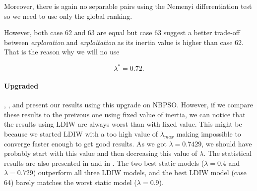\documentclass[12pt, openany]{article}
\begin{document}
Moreover, there is again no separable pairs using the Nemenyi differentiation test so we need to use only the global ranking.

\begin{table}[H]
    \centering
    \renewcommand{\arraystretch}{1.3}
    \caption{\textbf{Summary of statistical significance tests for the static inertia weight $\lambda$ (Cases 61--63).} The Critical Difference (CD) sets the threshold for Nemenyi pairwise significance. No difference is significant at $\alpha=0.05$ (the global test is borderline, $p \approx 0.07$, with the high-inertia Case~61 ranked weakest).}
    \label{tab:statistical_tests_inertia}
\end{table}

However, both case 62 and 63 are equal but case 63 suggest a better trade-off between \emph{exploration} and \emph{exploitation} as its inertia value is higher than case 62. That is the reason why we will no use

$$
\boxed{
    \lambda^* = 0.72
}.
$$



\paragraph{Upgraded} , ,  and  present our results using this upgrade on NBPSO. However, if we compare these results to the preivous one using fixed value of inertia, we can notice that the results using LDIW are always worst than with fixed value. This might be because we started LDIW with a too high value of $\lambda_{max}$ making impossible to converge faster enough to get good results. As we got $\lambda=0.7429$, we should have probably start with this value and then decreasing this value of $\lambda$. The statistical results are also presented in  and in . The two best static models ($\lambda=0.4$ and $\lambda=0.729$) outperform all three LDIW models, and the best LDIW model (case 64) barely matches the worst static model ($\lambda=0.9$).
\end{document}
